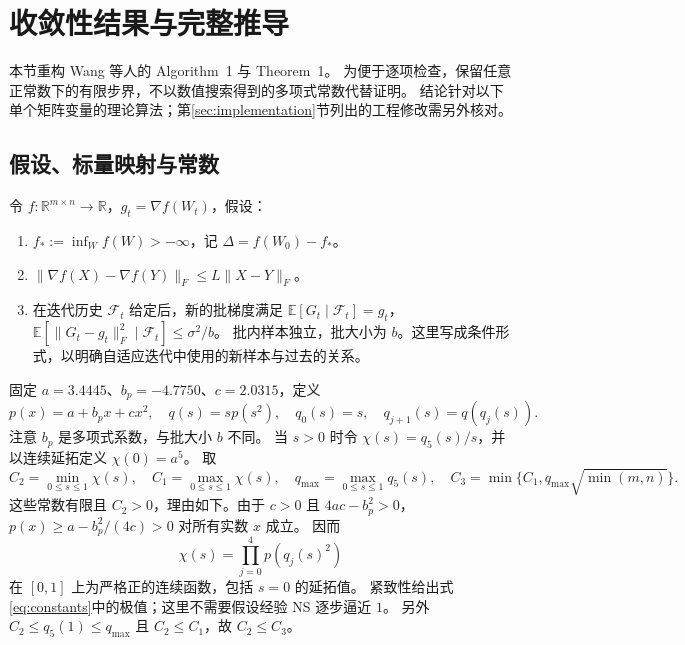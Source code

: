 \section{收敛性结果与完整推导}
本节重构 Wang 等人\cite{wang2026practical}的 Algorithm~1 与 Theorem~1。
为便于逐项检查，保留任意正常数下的有限步界，不以数值搜索得到的多项式常数代替证明。
结论针对以下单个矩阵变量的理论算法；第\ref{sec:implementation}节列出的工程修改需另外核对。

\subsection{假设、标量映射与常数}
令 $f:\mathbb R^{m\times n}\to\mathbb R$，$g_t=\nabla f(W_t)$，假设：
\begin{enumerate}
\item $f_*:=\inf_W f(W)>-\infty$，记 $\Delta=f(W_0)-f_*$。
\item $\|\nabla f(X)-\nabla f(Y)\|_F\le L\|X-Y\|_F$。
\item 在迭代历史 $\mathcal F_t$ 给定后，新的批梯度满足
 $\mathbb E[G_t\mid\mathcal F_t]=g_t$，
 $\mathbb E[\|G_t-g_t\|_F^2\mid\mathcal F_t]\le\sigma^2/b$。
 批内样本独立，批大小为 $b$。这里写成条件形式，以明确自适应迭代中使用的新样本与过去的关系。
\end{enumerate}

固定 $a=3.4445$、$b_p=-4.7750$、$c=2.0315$，定义
\begin{equation}
 p(x)=a+b_px+cx^2,\quad q(s)=s p(s^2),\quad
 q_0(s)=s,\quad q_{j+1}(s)=q(q_j(s)).
\end{equation}
注意 $b_p$ 是多项式系数，与批大小 $b$ 不同。
当 $s>0$ 时令 $\chi(s)=q_5(s)/s$，并以连续延拓定义 $\chi(0)=a^5$。
取
\begin{equation}\label{eq:constants}
 C_2=\min_{0\le s\le1}\chi(s),\quad
 C_1=\max_{0\le s\le1}\chi(s),\quad
 q_{\max}=\max_{0\le s\le1}q_5(s),\quad
 C_3=\min\{C_1,q_{\max}\sqrt{\min(m,n)}\}.
\end{equation}
这些常数有限且 $C_2>0$，理由如下。由于 $c>0$ 且 $4ac-b_p^2>0$，
$p(x)\ge a-b_p^2/(4c)>0$ 对所有实数 $x$ 成立。
因而
\[
 \chi(s)=\prod_{j=0}^{4}p(q_j(s)^2)
\]
在 $[0,1]$ 上为严格正的连续函数，包括 $s=0$ 的延拓值。
紧致性给出式\eqref{eq:constants}中的极值；这里不需要假设经验 NS 逐步逼近 $1$。
另外 $C_2\le q_5(1)\le q_{\max}$ 且 $C_2\le C_1$，故 $C_2\le C_3$。

